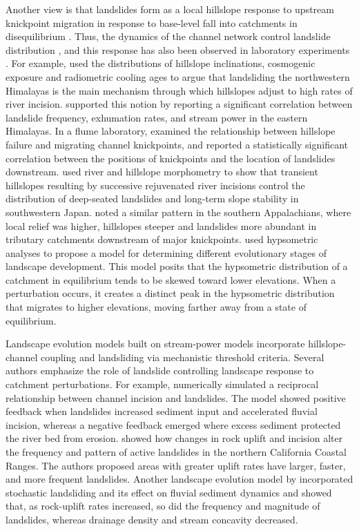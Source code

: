 \documentclass[draft]{agujournal2019}
\begin{document}
\par Another view is that landslides form as a local hillslope response to upstream knickpoint migration in response to base-level fall into catchments in disequilibrium \cite{Wobus2006, hovius2006, Whipple2002}. Thus, the dynamics of the channel network control landslide distribution  \cite{montgomery1994, burbank1996}, and this response has also been observed in laboratory experiments \cite{Bigi2006, hasbargen2000}. For example,  used the distributions of hillslope inclinations, cosmogenic exposure and radiometric cooling ages to argue that landsliding the northwestern Himalayas is the main mechanism through which hillslopes adjust to high rates of river incision.  supported this notion by reporting a significant correlation between landslide frequency, exhumation rates, and stream power in the eastern Himalayas. In a flume laboratory,  examined the relationship between hillslope failure and migrating channel knickpoints, and reported a statistically significant correlation between the positions of knickpoints and the location of landslides downstream.  used river and hillslope morphometry to show that transient hillslopes resulting by successive rejuvenated river incisions control the distribution of deep-seated landslides and long-term slope stability in southwestern Japan.  noted a similar pattern in the southern Appalachians, where local relief was higher, hillslopes steeper and landslides more abundant in tributary catchments downstream of major knickpoints.  used hypsometric analyses to propose a model for determining different evolutionary stages of landscape development. This model posits that the hypsometric distribution of a catchment in equilibrium tends to be skewed toward lower elevations. When a perturbation occurs, it creates a distinct peak in the hypsometric distribution that migrates to higher elevations, moving farther away from a state of equilibrium. 

\par Landscape evolution models built on stream-power models incorporate hillslope-channel coupling and landsliding via mechanistic threshold criteria. Several authors emphasize the role of landslide controlling landscape response to catchment perturbations. For example,  numerically simulated a reciprocal relationship between channel incision and landslides. The model showed positive feedback when landslides increased sediment input and accelerated fluvial incision, whereas a negative feedback emerged where excess sediment protected the river bed from erosion.  showed how changes in rock uplift and incision alter the frequency and pattern of active landslides in the northern California Coastal Ranges. The authors proposed areas with greater uplift rates have larger, faster, and more frequent landslides. Another landscape evolution model by  incorporated stochastic landsliding and its effect on fluvial sediment dynamics and showed that, as rock-uplift rates increased, so did the frequency and magnitude of landslides, whereas drainage density and stream concavity decreased.
\end{document}
